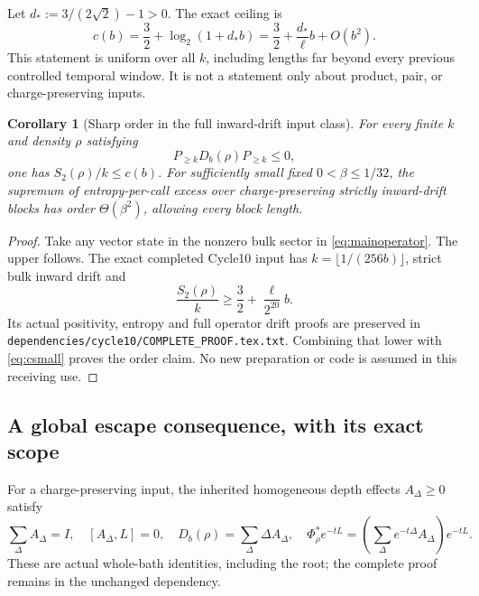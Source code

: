 \documentclass[11pt]{article}
\newtheorem{corollary}[theorem]{Corollary}
\begin{document}
Let \(d_*:=3/(2\sqrt2)-1>0\). The exact ceiling is
\begin{equation}\label{eq:csmall}
 c(b)=\frac32+\log_2(1+d_*b)
 =\frac32+\frac{d_*}{\ell}b+O(b^2).
\end{equation}
This statement is uniform over all \(k\), including lengths far beyond
every previous controlled temporal window. It is not a statement only
about product, pair, or charge-preserving inputs.

\begin{corollary}[Sharp order in the full inward-drift input class]
\label{cor:inward}
For every finite \(k\) and density \(\rho\) satisfying
\[
 P_{\ge k}D_b(\rho)P_{\ge k}\le0,
\]
one has \(S_2(\rho)/k\le c(b)\). For sufficiently small fixed
\(0<\beta\le1/32\), the supremum of entropy-per-call excess over
charge-preserving strictly inward-drift blocks has order
\(\Theta(\beta^2)\), allowing every block length.
\end{corollary}
\begin{proof}
Take any vector state in the nonzero bulk sector in
\eqref{eq:mainoperator}. The upper follows. The exact completed Cycle10
input has \(k=\lfloor1/(256b)\rfloor\), strict bulk inward drift and
\[
 \frac{S_2(\rho)}k\ge\frac32+\frac{\ell}{2^{20}}b.
\]
Its actual positivity, entropy and full operator drift proofs \cite{Cycle10} are
preserved in \texttt{dependencies/cycle10/COMPLETE\_PROOF.tex.txt}.
Combining that lower with \eqref{eq:csmall} proves the order claim.
No new preparation or code is assumed in this receiving use.
\end{proof}

\subsection{A global escape consequence, with its exact scope}

For a charge-preserving input, the inherited homogeneous depth effects
\(A_\Delta\ge0\) satisfy
\[
 \sum_\Delta A_\Delta=I,\quad[A_\Delta,L]=0,\quad
 D_b(\rho)=\sum_\Delta\Delta A_\Delta,\quad
 \Phi_\rho^*e^{-tL}
 =\left(\sum_\Delta e^{-t\Delta}A_\Delta\right)e^{-tL}.
\]
These are actual whole-bath identities, including the root; the complete
proof remains in the unchanged dependency.
\end{document}
